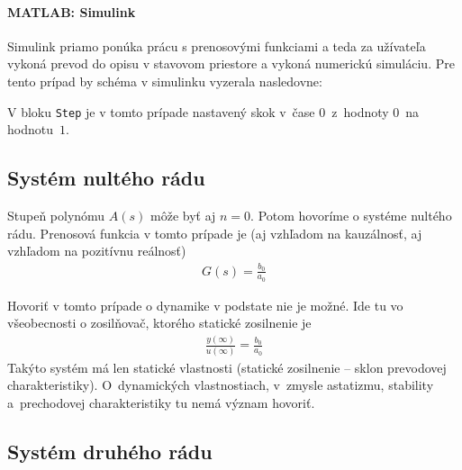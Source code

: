\documentclass[a4paper, 10pt, ]{article}
\begin{document}
\paragraph{MATLAB: Simulink}

Simulink priamo ponúka prácu s prenosovými funkciami a teda za užívateľa vykoná prevod do opisu v stavovom priestore a vykoná numerickú simuláciu. Pre tento prípad by schéma v simulinku vyzerala nasledovne:

\begin{center}


    \vspace{-5mm}

	\label{sim_PCHSS1R}

    \vspace{-1mm}

\end{center}

V bloku \lstinline|Step| je v tomto prípade nastavený skok v~čase $0$~z~hodnoty $0$~na hodnotu~$1$.





\subsection{Systém nultého rádu}

Stupeň polynómu $A(s)$ môže byť aj $n = 0$. Potom hovoríme o systéme nultého rádu. Prenosová funkcia v tomto prípade je (aj vzhľadom na kauzálnosť, aj vzhľadom na pozitívnu reálnosť)
\begin{align}
    G(s) = \frac{b_0}{a_0}
\end{align}

Hovoriť v tomto prípade o dynamike v podstate nie je možné. Ide tu vo všeobecnosti o zosilňovač, ktorého statické zosilnenie je
\begin{align}
    \frac{y(\infty)}{u(\infty)} = \frac{b_0 }{a_0}
\end{align}
Takýto systém má len statické vlastnosti (statické zosilnenie -- sklon prevodovej charakteristiky). O~dynamických vlastnostiach, v~zmysle astatizmu, stability a~prechodovej charakteristiky tu nemá význam hovoriť.






\subsection{Systém druhého rádu}
\end{document}
